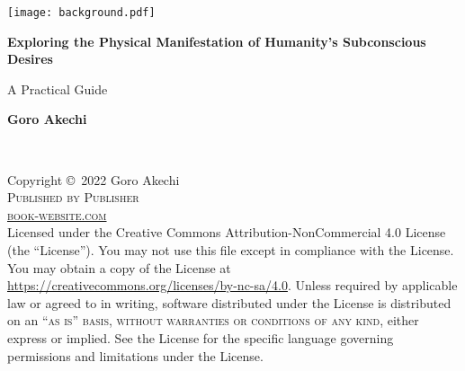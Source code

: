 \documentclass[
	11pt, %
	fleqn, %
	a4paper, %
]{LegrandOrangeBook}
\begin{document}

\titlepage %
	{\texttt{[image: background.pdf]}} %
	{ %
		\centering\sffamily %
		{\Huge\bfseries Exploring the Physical Manifestation of Humanity's Subconscious Desires\par} %
		\vspace{16pt} %
		{\LARGE A Practical Guide\par} %
		\vspace{24pt} %
		{\huge\bfseries Goro Akechi\par} %
	}


\thispagestyle{empty} %

~\vfill %

\noindent Copyright \copyright\ 2022 Goro Akechi\\ %

\noindent \textsc{Published by Publisher}\\ %

\noindent \textsc{\href{https://www.latextemplates.com/template/legrand-orange-book}{book-website.com}}\\ %

\noindent Licensed under the Creative Commons Attribution-NonCommercial 4.0 License (the ``License'').
You may not use this file except in compliance with the License.
You may obtain a copy of the License at \url{https://creativecommons.org/licenses/by-nc-sa/4.0}.
Unless required by applicable law or agreed to in writing, software distributed under the License is distributed on an \textsc{``as is'' basis, without warranties or conditions of any kind}, either express or implied.
See the License for the specific language governing permissions and limitations under the License.\\ %
\end{document}
